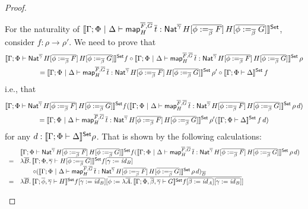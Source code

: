 \documentclass[acmsmall,review,anonymous]{acmart}
\theoremstyle{definition}
\renewcommand{\id}{\mathit{id}}
\newcommand{\map}{\mathsf{map}}
\begin{document}
\begin{proof}
\begin{itemize}
For the naturality of
$\setsem{\Gamma; \Phi~|~\Delta \vdash \map^{\ol{F},\ol{G}}_H\, \ol{t}
  : \Nat^{\ol{\gamma}}\,H[\ol{\phi :=_{\ol{\beta}} F}]\,H[\ol{\phi
      :=_{\ol{\beta}} G}]}$,
consider $f : \rho \to \rho'$.
We need to prove that
\begin{multline*}
\setsem{\Gamma; \Phi \vdash
 \Nat^{\ol{\gamma}}\,H[\ol{\phi :=_{\ol{\beta}} F}]\,H[\ol{\phi
      :=_{\ol{\beta}} G}]} f
\circ
\setsem{\Gamma; \Phi~|~\Delta \vdash
\map^{\ol{F},\ol{G}}_H\, \ol{t} :
\Nat^{\ol{\gamma}}\,H[\ol{\phi :=_{\ol{\beta}} F}]\,H[\ol{\phi
    :=_{\ol{\beta}} G}]}\,\rho \\
= 
\setsem{\Gamma; \Phi~|~\Delta \vdash
\map^{\ol{F},\ol{G}}_H\, \ol{t} :
\Nat^{\ol{\gamma}}\,H[\ol{\phi :=_{\ol{\beta}} F}]\,H[\ol{\phi
    :=_{\ol{\beta}} G}]}\,\rho'
\circ
\setsem{\Gamma; \Phi \vdash \Delta}\, f
\end{multline*}
i.e., that
\begin{multline*}
\setsem{\Gamma; \Phi \vdash 
\Nat^{\ol{\gamma}}\,H[\ol{\phi :=_{\ol{\beta}} F}]\,H[\ol{\phi
      :=_{\ol{\beta}} G}]} f
(\setsem{\Gamma; \Phi~|~\Delta \vdash
\map^{\ol{F},\ol{G}}_H\, \ol{t} :
\Nat^{\ol{\gamma}}\,H[\ol{\phi :=_{\ol{\beta}} F}]\,H[\ol{\phi
    :=_{\ol{\beta}} G}]}\,\rho\,d) \\
=
\setsem{\Gamma; \Phi~|~\Delta \vdash
\map^{\ol{F},\ol{G}}_H\, \ol{t} :
\Nat^{\ol{\gamma}}\,H[\ol{\phi :=_{\ol{\beta}} F}]\,H[\ol{\phi
    :=_{\ol{\beta}} G}]}\,\rho'
(\setsem{\Gamma; \Phi \vdash \Delta}\, f\, d )
\end{multline*}
for any $d : \llbracket{\Gamma; \Phi \vdash \Delta}\rrbracket^{\mathsf{Set}} \rho$.
That is shown by the following calculations:
\[
\begin{array}{ll}
&\setsem{\Gamma; \Phi \vdash 
\Nat^{\ol{\gamma}}\,H[\ol{\phi :=_{\ol{\beta}} F}]\,H[\ol{\phi
      :=_{\ol{\beta}} G}]} f
(\setsem{\Gamma; \Phi~|~\Delta \vdash
\map^{\ol{F},\ol{G}}_H\, \ol{t} :
\Nat^{\ol{\gamma}}\,H[\ol{\phi :=_{\ol{\beta}} F}]\,H[\ol{\phi
    :=_{\ol{\beta}} G}]}\,\rho\,d) \\
=&
\lambda \ol{B}.\,
\setsem{\Gamma; \Phi, \ol{\gamma} \vdash 
H[\ol{\phi :=_{\ol{\beta}} G}]} f[\ol{\gamma := \id_B}] \\
&\hspace{2em}\circ
(\setsem{\Gamma; \Phi~|~\Delta \vdash
\map^{\ol{F},\ol{G}}_H\, \ol{t} :
\Nat^{\ol{\gamma}}\,H[\ol{\phi :=_{\ol{\beta}} F}]\,H[\ol{\phi
    :=_{\ol{\beta}} G}]}\,\rho\,d)_{\ol{B}} \\
=&
\lambda \ol{B}.\,
\setsem{\Gamma; \ol{\phi}, \ol{\gamma} \vdash 
H} f[\ol{\gamma := \id_B}] [\ol{\phi := \lambda \ol{A}.\, \setsem{\Gamma; \Phi, \ol{\beta}, \ol{\gamma} \vdash G}f[\ol{\beta := \id_A}][\ol{\gamma := \id_B}]}] \\

\end{array}\]
\end{itemize}
\end{proof}
\end{document}
